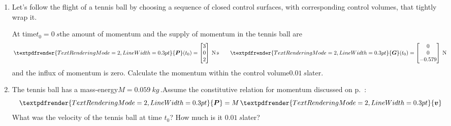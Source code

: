 \documentclass[a4paper,12pt,%
onecolumn,oneside,titlepage,%
british%
]{memoir}
\renewcommand*{\bm}[1]{\textpdfrender{TextRenderingMode=2,LineWidth=0.3pt}{\boldsymbol{#1}}}
\renewcommand*{\|}[1][]{\nonscript\:#1\vert\nonscript\:\mathopen{}}
\newcommand*{\yv}{\bm{v}}
\newcommand*{\yM}{M}%
\newcommand*{\yP}{\bm{P}}
\newcommand*{\yG}{\bm{G}}
\newcommand*{\masse}{mass-energy}
\begin{document}
\begin{exercise}[label={ex:tennisball}]
  \begin{enumerate}[shift,label=\bfseries\arabic*.]
  \item Let's follow the flight of a tennis ball by choosing a sequence of closed control surfaces, with corresponding control volumes, that tightly wrap it.

    At time\enspace$t_{0}=\qty{0}{s}$\enspace the amount of momentum and the supply of momentum in the tennis ball are
    \begin{equation*}
      \yP(t_{0}) =
      \begin{bmatrix}
        3\\0\\2
      \end{bmatrix}\:\unit{N\,s}
      \qquad
      \yG(t_{0}) =
      \begin{bmatrix}
        0\\0\\-0.579
      \end{bmatrix}\:\unit{N}
    \end{equation*}
    and the influx of momentum is zero. Calculate the momentum within the control volume\enspace$\qty{0.01}{s}$\enspace later.

  \item The tennis ball has a \masse\enspace$\yM = \qty{0.059}{kg}$\,.\enspace Assume the constitutive relation for momentum discussed on p.~\pageref{item:momentum_mass_velocity}:
    \begin{equation*}
      \yP = \yM\,\yv
    \end{equation*}
    What was the velocity of the tennis ball at time $t_{0}$? How much is it \enspace$\qty{0.01}{s}$\enspace later?
  \end{enumerate}
\end{exercise}
%
\end{document}
